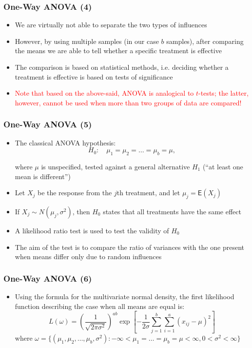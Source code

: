 \documentclass[10pt]{beamer}
\theoremstyle{definition}
\begin{document}
\begin{frame}[fragile]
\frametitle{One-Way ANOVA (4)}
\begin{itemize}
	\item We are virtually not able to separate the two types of influences
	\item However, by using multiple samples (in our case $b$ samples), after comparing the means we are able to tell whether a specific treatment is effective
	\item The comparison is based on statistical methods, i.e. deciding whether a treatment is effective is based on tests of significance
	\item \textcolor{red}{Note that based on the above-said, ANOVA is analogical to $t$-tests; the latter, however, cannot be used when more than two groups of data are compared!}
\end{itemize}
\end{frame}

\begin{frame}[fragile]
\frametitle{One-Way ANOVA (5)}
\begin{itemize}
	\item The classical ANOVA hypothesis:
	\[
		H_{0}:\quad \mu_{1} = \mu_{2} = \ldots = \mu_{b} = \mu,
	\]
	
	where $\mu$ is unspecified, tested against a general alternative $H_{1}$ (``at least one mean is different'')
	\item Let $X_{j}$ be the response from the $j$th treatment, and let $\mu_{j} = \mathsf{E}(X_{j})$
	\item If $X_{j}\sim N(\mu_{j},\sigma^{2})$, then $H_{0}$ states that all treatments have the same effect
	\item A likelihood ratio test is used to test the validity of $H_{0}$
	\item The aim of the test is to compare the ratio of variances with the one present when means differ only due to random influences
\end{itemize}
\end{frame}

\begin{frame}[fragile]
\frametitle{One-Way ANOVA (6)}
\begin{itemize}
	\item Using the formula for the multivariate normal density, the first likelihood function describing the case when all means are equal is:
	\[
		L(\omega) = \left(\frac{1}{\sqrt{2\pi\sigma^{2}}}\right)^{ab}\exp\left[-\frac{1}{2\sigma}\sum_{j=1}^{b}\sum_{i=1}^{a}(x_{ij} - \mu)^{2}\right]
	\]
	where $\omega = \{(\mu_{1},\mu_{2},\ldots,\mu_{b},\sigma^{2}): -\infty < \mu_{1} = \ldots = \mu_{b} = \mu < \infty, 0 < \sigma^{2} < \infty\}$
\end{itemize}
\end{frame}
\end{document}
